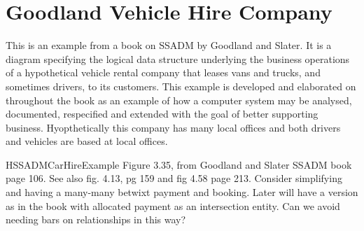 \section{Goodland Vehicle Hire Company}
\label{GoodlandVehicleHireCompany}

\mynote This is an example from a book on SSADM by Goodland and Slater.
\mynote It is a diagram specifying the logical data structure underlying the business operations of a hypothetical vehicle rental company that leases vans and trucks, and sometimes drivers, to its customers. 
\mynote
This example is developed and elaborated on throughout the book as an example of how a computer system may be analysed, documented, respecified and extended with the goal of better supporting business.
\mynote Hyopthetically this company has many local offices and both drivers and vehicles are based at local offices. 
\begin{erboxedFigure} {H}{SSADMCarHireExample}{
Figure 3.35, from Goodland and Slater SSADM book page 106. See also fig. 4.13, pg 159 and fig 4.58 page 213.
Consider simplifying and having a many-many betwixt payment and booking. 
Later will have a version as in the book with allocated payment as an intersection entity. 
Can we avoid needing bars on relationships in this way?
}

\begin{center}
\scalebox{0.95}{}
\end{center}
\end{erboxedFigure}